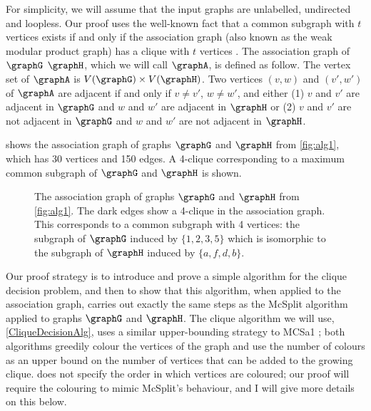 For simplicity, we will assume that the input graphs are unlabelled,
undirected and loopless.
Our proof uses the well-known fact that a common subgraph with $t$ vertices exists
if and only if the association graph (also known as the weak modular product graph)
has a clique with $t$ vertices \cite{LeviG}.  The association graph of $\graphG$ 
$\graphH$, which we will
call $\graphA$, is defined as follow.  The vertex set of $\graphA$ is
$V(\graphG) \times V(\graphH)$.  Two vertices $(v,w)$ and $(v',w')$ of $\graphA$
are adjacent if and only if $v \not= v'$, $w \not= w'$, and either (1) $v$ and $v'$
are adjacent in $\graphG$ and $w$ and $w'$ are adjacent in $\graphH$ or (2) $v$ and $v'$
are not adjacent in $\graphG$ and $w$ and $w'$ are not adjacent in $\graphH$.

 shows the association graph of graphs $\graphG$ and $\graphH$
from \cref{fig:alg1}, which has 30 vertices and 150 edges.  A 4-clique corresponding to
a maximum common subgraph of $\graphG$ and $\graphH$ is shown.

\begin{figure}[htb]
\centering
\caption{The association graph of graphs $\graphG$ and $\graphH$ from \cref{fig:alg1}.  The dark edges
    show a 4-clique in
    the association graph. This corresponds to a common subgraph with 4 vertices: the subgraph of $\graphG$ induced by
    $\{1,2,3,5\}$ which is isomorphic to the subgraph of $\graphH$ induced by $\{a,f,d,b\}$.}
\label{fig:association-graph}
\end{figure}

Our proof strategy is to introduce and prove a simple algorithm for the clique
decision problem, and then to show that this algorithm, when applied to the association
graph, carries out exactly the same steps as the McSplit algorithm applied to graphs
$\graphG$ and $\graphH$.  The clique algorithm we will use, \cref{CliqueDecisionAlg},
uses a similar upper-bounding strategy to MCSa1 \cite{DBLP:journals/algorithms/Prosser12,DBLP:journals/ieicet/TomitaSHW13};
both algorithms greedily colour the vertices of the graph and use the number of colours
as an upper bound on the number of vertices that can be added to the growing clique.
 does not specify the order in which vertices are coloured;
our proof will require the colouring to mimic McSplit's behaviour, and I will give
more details on this below.

